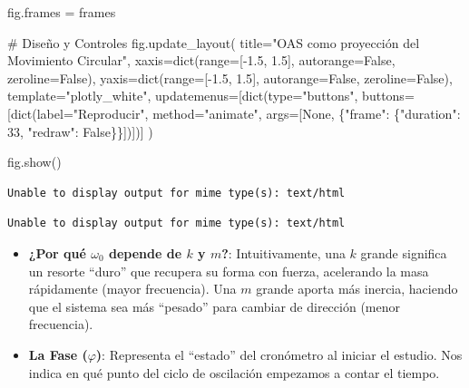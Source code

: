 \documentclass[
  letterpaper,
  DIV=11,
  numbers=noendperiod]{scrreprt}
\newenvironment{Shaded}{\begin{snugshade}}{\end{snugshade}}
\newcommand{\BuiltInTok}[1]{\textcolor[rgb]{0.00,0.23,0.31}{#1}}
\newcommand{\CommentTok}[1]{\textcolor[rgb]{0.37,0.37,0.37}{#1}}
\newcommand{\DecValTok}[1]{\textcolor[rgb]{0.68,0.00,0.00}{#1}}
\newcommand{\FloatTok}[1]{\textcolor[rgb]{0.68,0.00,0.00}{#1}}
\newcommand{\NormalTok}[1]{\textcolor[rgb]{0.00,0.23,0.31}{#1}}
\newcommand{\OperatorTok}[1]{\textcolor[rgb]{0.37,0.37,0.37}{#1}}
\newcommand{\StringTok}[1]{\textcolor[rgb]{0.13,0.47,0.30}{#1}}
\newcommand{\VariableTok}[1]{\textcolor[rgb]{0.07,0.07,0.07}{#1}}
\providecommand{\tightlist}{%
  \setlength{\itemsep}{0pt}\setlength{\parskip}{0pt}}
\begin{document}
\begin{Shaded}
\begin{Highlighting}[]
\NormalTok{fig.frames }\OperatorTok{=}\NormalTok{ frames}

\CommentTok{\# Diseño y Controles}
\NormalTok{fig.update\_layout(}
\NormalTok{    title}\OperatorTok{=}\StringTok{"OAS como proyección del Movimiento Circular"}\NormalTok{,}
\NormalTok{    xaxis}\OperatorTok{=}\BuiltInTok{dict}\NormalTok{(}\BuiltInTok{range}\OperatorTok{=}\NormalTok{[}\OperatorTok{{-}}\FloatTok{1.5}\NormalTok{, }\FloatTok{1.5}\NormalTok{], autorange}\OperatorTok{=}\VariableTok{False}\NormalTok{, zeroline}\OperatorTok{=}\VariableTok{False}\NormalTok{),}
\NormalTok{    yaxis}\OperatorTok{=}\BuiltInTok{dict}\NormalTok{(}\BuiltInTok{range}\OperatorTok{=}\NormalTok{[}\OperatorTok{{-}}\FloatTok{1.5}\NormalTok{, }\FloatTok{1.5}\NormalTok{], autorange}\OperatorTok{=}\VariableTok{False}\NormalTok{, zeroline}\OperatorTok{=}\VariableTok{False}\NormalTok{),}
\NormalTok{    template}\OperatorTok{=}\StringTok{"plotly\_white"}\NormalTok{,}
\NormalTok{    updatemenus}\OperatorTok{=}\NormalTok{[}\BuiltInTok{dict}\NormalTok{(}\BuiltInTok{type}\OperatorTok{=}\StringTok{"buttons"}\NormalTok{, buttons}\OperatorTok{=}\NormalTok{[}\BuiltInTok{dict}\NormalTok{(label}\OperatorTok{=}\StringTok{"Reproducir"}\NormalTok{, method}\OperatorTok{=}\StringTok{"animate"}\NormalTok{, }
\NormalTok{                                                    args}\OperatorTok{=}\NormalTok{[}\VariableTok{None}\NormalTok{, \{}\StringTok{"frame"}\NormalTok{: \{}\StringTok{"duration"}\NormalTok{: }\DecValTok{33}\NormalTok{, }\StringTok{"redraw"}\NormalTok{: }\VariableTok{False}\NormalTok{\}\}])])]}
\NormalTok{)}

\NormalTok{fig.show()}
\end{Highlighting}
\end{Shaded}

\begin{verbatim}
Unable to display output for mime type(s): text/html
\end{verbatim}

\begin{verbatim}
Unable to display output for mime type(s): text/html
\end{verbatim}

\begin{itemize}
\tightlist
\item
  \textbf{¿Por qué \(\omega_0\) depende de \(k\) y \(m\)?}:
  Intuitivamente, una \(k\) grande significa un resorte ``duro'' que
  recupera su forma con fuerza, acelerando la masa rápidamente (mayor
  frecuencia). Una \(m\) grande aporta más inercia, haciendo que el
  sistema sea más ``pesado'' para cambiar de dirección (menor
  frecuencia).
\item
  \textbf{La Fase (\(\varphi\))}: Representa el ``estado'' del
  cronómetro al iniciar el estudio. Nos indica en qué punto del ciclo de
  oscilación empezamos a contar el tiempo.
\end{itemize}
\end{document}
